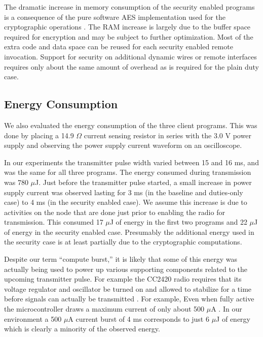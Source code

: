 The dramatic increase in memory consumption of the security enabled programs is a consequence of
the pure software AES implementation used for the cryptographic operations
\cite{erdelsky-rijndael-2002}. The RAM increase is largely due to the buffer space required for
encryption and may be subject to further optimization. Most of the extra code and data space can
be reused for each security enabled remote invocation. Support for security on additional
dynamic wires or remote interfaces requires only about the same amount of overhead as is
required for the plain duty case.

\subsection{Energy Consumption}

We also evaluated the energy consumption of the three client programs. This was done by placing
a 14.9 $\Omega$ current sensing resistor in series with the 3.0 V power supply and observing the
power supply current waveform on an oscilloscope.

In our experiments the transmitter pulse width varied between 15 and 16 ms, and was the same for
all three programs. The energy consumed during transmission was 780 $\mu$J. Just before the
transmitter pulse started, a small increase in power supply current was observed lasting for 3
ms (in the baseline and duties-only case) to 4 ms (in the security enabled case). We assume this
increase is due to activities on the node that are done just prior to enabling the radio for
transmission. This  consumed 17 $\mu$J of energy in the first two
programs and 22 $\mu$J of energy in the security enabled case. Presumably the additional energy
used in the security case is at least partially due to the cryptographic computations.

Despite our term ``compute burst,'' it is likely that some of this energy was actually being
used to power up various supporting components related to the upcoming transmitter pulse. For
example the CC2420 radio requires that its voltage regulator and oscillator be turned on and
allowed to stabilize for a time before signals can actually be transmitted
\cite{cc2420-datasheet}. For example, Even when fully active the microcontroller draws a maximum
current of only about 500 $\mu$A \cite{msp430-datasheet}. In our environment a 500 $\mu$A
current burst of 4 ms corresponds to just 6 $\mu$J of energy which is clearly a minority of the
observed energy.
